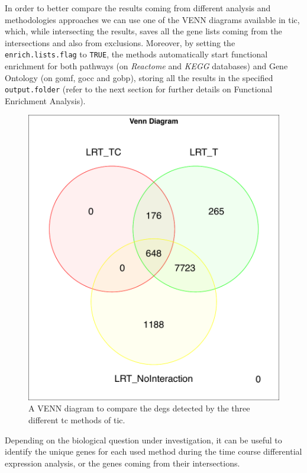 In order to better compare the results coming from different analysis and methodologies approaches we can use one of the VENN diagrams available in \gls{tic}, which, while intersecting the results, saves all the gene lists coming from the intersections and also from exclusions.
Moreover, by setting the \lstinline!enrich.lists.flag! to \lstinline!TRUE!, the methods automatically start functional enrichment for both pathways (on \textit{Reactome} and \textit{KEGG} databases) and Gene Ontology (on \gls{gomf}, \gls{gocc} and \gls{gobp}), storing all the results in the specified \lstinline!output.folder! (refer to the next section for further details on Functional Enrichment Analysis).

\begin{figure}[H]
\includegraphics[width=\textwidth,height=\textheight,keepaspectratio]{img/ticorser/de/venn3.pdf}
\caption[ticorser venn diagram]{A VENN diagram to compare the \glspl{deg} detected by the three different \gls{tc} methods of \gls{tic}.}
\label{fig:ticorservenn}
\centering
\end{figure}

Depending on the biological question under investigation, it can be useful to identify the unique genes for each used method during the time course differential expression analysis, or the genes coming from their intersections.

